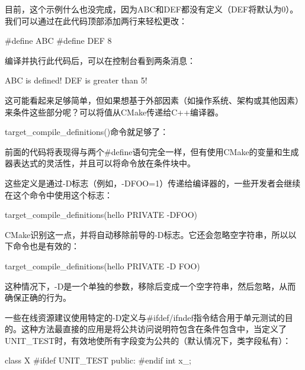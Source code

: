 目前，这个示例什么也没完成，因为ABC和DEF都没有定义（DEF将默认为0）。我们可以通过在此代码顶部添加两行来轻松更改：

\begin{cpp}
#define ABC
#define DEF 8
\end{cpp}

编译并执行此代码后，可以在控制台看到两条消息：

\begin{shell}
ABC is defined!
DEF is greater than 5!
\end{shell}

这可能看起来足够简单，但如果想基于外部因素（如操作系统、架构或其他因素）来条件这些部分呢？可以将值从CMake传递给C++编译器。

target\_compile\_definitions()命令就足够了：



前面的代码将表现得与两个\#define语句完全一样，但有使用CMake的变量和生成器表达式的灵活性，并且可以将命令放在条件块中。

这些定义是通过-D标志（例如，-DFOO=1）传递给编译器的，一些开发者会继续在这个命令中使用这个标志：

\begin{cmake}
target_compile_definitions(hello PRIVATE -DFOO)
\end{cmake}

CMake识别这一点，并将自动移除前导的-D标志。它还会忽略空字符串，所以以下命令也是有效的：

\begin{cmake}
target_compile_definitions(hello PRIVATE -D FOO)
\end{cmake}

这种情况下，-D是一个单独的参数，移除后变成一个空字符串，然后忽略，从而确保正确的行为。


一些在线资源建议使用特定的-D定义与\#ifdef/ifndef指令结合用于单元测试的目的。这种方法最直接的应用是将公共访问说明符包含在条件包含中，当定义了UNIT\_TEST时，有效地使所有字段变为公共的（默认情况下，类字段私有）：

\begin{cpp}
class X {
#ifdef UNIT_TEST
    public:
#endif
    int x_;
}
\end{cpp}

